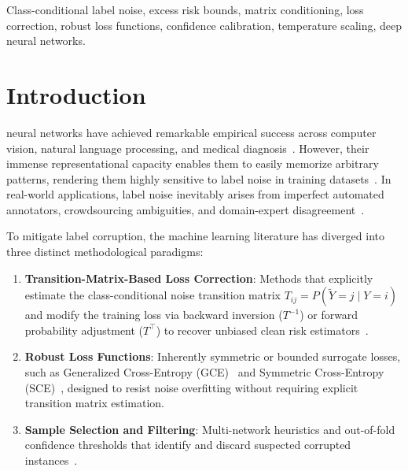 \documentclass[journal]{IEEEtran}
\theoremstyle{definition}
\begin{document}
\begin{abstract}
\end{abstract}

\begin{IEEEkeywords}
Class-conditional label noise, excess risk bounds, matrix conditioning, loss correction, robust loss functions, confidence calibration, temperature scaling, deep neural networks.
\end{IEEEkeywords}

\section{Introduction}
 neural networks have achieved remarkable empirical success across computer vision, natural language processing, and medical diagnosis~\cite{he2016identity,zhang2017understanding}. However, their immense representational capacity enables them to easily memorize arbitrary patterns, rendering them highly sensitive to label noise in training datasets~\cite{zhang2017understanding,arpit2017closer}. In real-world applications, label noise inevitably arises from imperfect automated annotators, crowdsourcing ambiguities, and domain-expert disagreement~\cite{song2022learning,wei2022learning}.

To mitigate label corruption, the machine learning literature has diverged into three distinct methodological paradigms:
\begin{enumerate}
    \item \textbf{Transition-Matrix-Based Loss Correction}: Methods that explicitly estimate the class-conditional noise transition matrix $T_{ij} = P(\tilde{Y}=j \mid Y=i)$ and modify the training loss via backward inversion ($T^{-1}$) or forward probability adjustment ($T^\top$) to recover unbiased clean risk estimators~\cite{natarajan2013learning,patrini2017making,xia2019are}.
    \item \textbf{Robust Loss Functions}: Inherently symmetric or bounded surrogate losses, such as Generalized Cross-Entropy (GCE)~\cite{zhang2018generalized} and Symmetric Cross-Entropy (SCE)~\cite{wang2019symmetric}, designed to resist noise overfitting without requiring explicit transition matrix estimation.
    \item \textbf{Sample Selection and Filtering}: Multi-network heuristics and out-of-fold confidence thresholds that identify and discard suspected corrupted instances~\cite{han2018co,li2020dividemix,northcutt2021confident}.
\end{enumerate}
\end{document}
